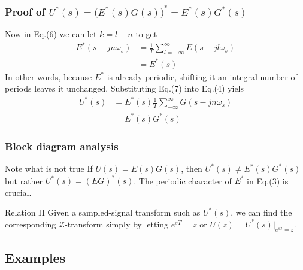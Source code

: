 \begin{frame}
	\frametitle{Proof of $U^{*}(s) = \big(E^{*}(s)G(s)\big)^{*} = E^{*}(s)G^{*}(s)$}
	Now in Eq.(6) we can let $k = l - n$ to get
	\begin{equation}
	\begin{split}
	E^{*}(s-jn\omega_s) &= \frac{1}{T} \sum_{l=-\infty}^{\infty} E(s - jl\omega_s)\\
	&= E^{*}(s)
	\end{split}
	\end{equation}
	\justify
	In other words, because $E^{*}$ is already periodic, shifting it an integral number of periods leaves it unchanged. Substituting Eq.(7) into Eq.(4) yiels
	\begin{equation}
	\begin{split}
	U^{*}(s) &= E^{*}(s) \frac{1}{T} \sum_{-\infty}^{\infty} G(s - jn\omega_s)\\
	&= E^{*}(s)G^{*}(s)
	\end{split}
	\end{equation}
\end{frame}

\begin{frame}
	\frametitle{Block diagram analysis}
	\begin{alertblock}{Note what is not true}
		\justify
		If $U(s) = E(s)G(s)$, then $U^{*}(s) \neq E^{*}(s) G^{*}(s)$ but rather $U^{*}(s) = (EG)^{*}(s)$. The periodic character of $E^{*}$ in Eq.(3) is crucial.
	\end{alertblock}
	\vspace{1em}
	\begin{block}{Relation II}
		\justify
		Given a sampled-signal transform such as $U^{*}(s)$, we can find the corresponding $\mathcal{Z}$-transform simply by letting $e^{sT} = z$ or $U(z) = U^{*}(s)|_{e^{sT} = z}$.
	\end{block}
\end{frame}

\subsection{Examples}


